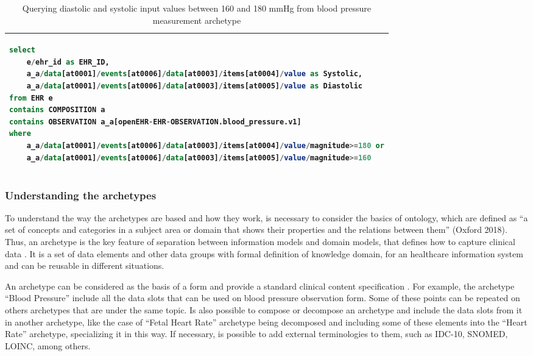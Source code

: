 \documentclass[mim_thesis.tex]{subfiles}
\begin{document}
\begin{table}[H]
	\centering
\caption{Querying diastolic and systolic input values between 160 and 180 mmHg from blood pressure measurement archetype}
\label{tab:bp_aql}
\begin{tabular}{l}
\toprule[2pt]
\begin{lstlisting}[language=SQL]
select
    e/ehr_id as EHR_ID,
    a_a/data[at0001]/events[at0006]/data[at0003]/items[at0004]/value as Systolic,
    a_a/data[at0001]/events[at0006]/data[at0003]/items[at0005]/value as Diastolic
from EHR e
contains COMPOSITION a
contains OBSERVATION a_a[openEHR-EHR-OBSERVATION.blood_pressure.v1]
where
    a_a/data[at0001]/events[at0006]/data[at0003]/items[at0004]/value/magnitude>=180 or
    a_a/data[at0001]/events[at0006]/data[at0003]/items[at0005]/value/magnitude>=160
\end{lstlisting}
\tabularnewline \bottomrule[2pt]
\end{tabular}
\end{table}

\newpage
\subsubsection{Understanding the archetypes}
To understand the way the archetypes are based and how they work, is necessary to consider the basics of ontology, which are defined as “a set of concepts and categories in a subject area or domain that shows their properties and the relations between them” (Oxford 2018). Thus, an archetype is the key feature of separation between information models and domain models, that defines how to capture clinical data \citep{Beale2007}. It is a set of data elements and other data groups with formal definition of knowledge domain, for an healthcare information system and can be reusable in different situations.

An archetype can be considered as the basis of a form and provide a standard clinical content specification \citep{Madsen2010}. For example, the archetype “Blood Pressure” include all the data slots that can be used on blood pressure observation form. Some of these points can be repeated on others archetypes that are under the same topic. Is also possible to compose or decompose an archetype and include the data slots from it in another archetype, like the case of “Fetal Heart Rate” archetype being decomposed and including some of these elements into the “Heart Rate” archetype, specializing it in this way. If necessary, is possible to add external terminologies to them, such as IDC-10, SNOMED, LOINC, among others.
\end{document}
